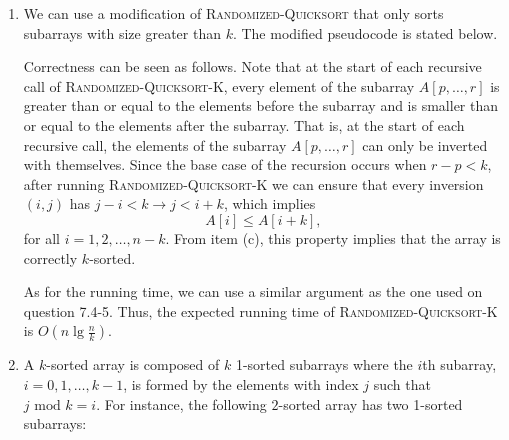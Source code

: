 \begin{enumerate}
\begin{framed}
\begin{enumerate}
\item We can use a modification of \textsc{Randomized-Quicksort} that only sorts
subarrays with size greater than $k$. The modified pseudocode is stated below.

\begin{algorithm}[H]
\SetAlgoNoEnd\DontPrintSemicolon
\BlankLine
{}
\nonl{}
\end{algorithm}

Correctness can be seen as follows. Note that at the start of each recursive
call of \textsc{Randomized-Quicksort-K}, every element of the subarray
$A[p, \dots, r]$ is greater than or equal to the elements before the subarray
and is smaller than or equal to the elements after the subarray. That is, at the
start of each recursive call, the elements of the subarray $A[p, \dots, r]$
can only be inverted with themselves. Since the base case of the recursion
occurs when $r - p < k$, after running \textsc{Randomized-Quicksort-K} we can
ensure that every inversion $(i, j)$ has $j - i < k \rightarrow j < i + k$,
which implies
\[
  A[i] \le A[i + k],
\]
for all $i = 1, 2, \dots, n - k$. From item (c), this property implies that the
array is correctly $k$-sorted.

As for the running time, we can use a similar argument as the one used on
question 7.4-5. Thus, the expected running time of
\textsc{Randomized-Quicksort-K} is $O\left(n \lg \frac{n}{k}\right)$.

\item A $k$-sorted array is composed of $k$ 1-sorted subarrays where the $i$th
subarray, $i = 0, 1, \dots, k - 1$, is formed by the elements with index $j$
such that $j \text{ mod } k = i$. For instance, the following $2$-sorted array
has two 1-sorted subarrays:
\begin{center}
\end{center}


\end{enumerate}
\end{framed}
\end{enumerate}
